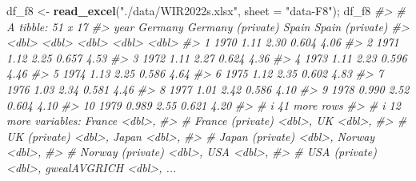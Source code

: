 \documentclass[
  xelatex, ja=standard]{bxjsbook}
\newenvironment{Shaded}{\begin{snugshade}}{\end{snugshade}}
\newcommand{\AttributeTok}[1]{\textcolor[rgb]{0.13,0.29,0.53}{#1}}
\newcommand{\CommentTok}[1]{\textcolor[rgb]{0.56,0.35,0.01}{\textit{#1}}}
\newcommand{\FunctionTok}[1]{\textcolor[rgb]{0.13,0.29,0.53}{\textbf{#1}}}
\newcommand{\NormalTok}[1]{#1}
\newcommand{\OtherTok}[1]{\textcolor[rgb]{0.56,0.35,0.01}{#1}}
\newcommand{\StringTok}[1]{\textcolor[rgb]{0.31,0.60,0.02}{#1}}
\theoremstyle{definition}
\theoremstyle{definition}
\theoremstyle{definition}
\theoremstyle{definition}
\theoremstyle{remark}
\begin{document}
\begin{Shaded}
\begin{Highlighting}[]
\NormalTok{df\_f8 }\OtherTok{\textless{}{-}} \FunctionTok{read\_excel}\NormalTok{(}\StringTok{"./data/WIR2022s.xlsx"}\NormalTok{, }\AttributeTok{sheet =} \StringTok{"data{-}F8"}\NormalTok{); df\_f8}
\CommentTok{\#\textgreater{} \# A tibble: 51 x 17}
\CommentTok{\#\textgreater{}     year Germany \textasciigrave{}Germany (private)\textasciigrave{} Spain \textasciigrave{}Spain (private)\textasciigrave{}}
\CommentTok{\#\textgreater{}    \textless{}dbl\textgreater{}   \textless{}dbl\textgreater{}               \textless{}dbl\textgreater{} \textless{}dbl\textgreater{}             \textless{}dbl\textgreater{}}
\CommentTok{\#\textgreater{}  1  1970   1.11                 2.30 0.604              4.06}
\CommentTok{\#\textgreater{}  2  1971   1.12                 2.25 0.657              4.53}
\CommentTok{\#\textgreater{}  3  1972   1.11                 2.27 0.624              4.36}
\CommentTok{\#\textgreater{}  4  1973   1.11                 2.23 0.596              4.46}
\CommentTok{\#\textgreater{}  5  1974   1.13                 2.25 0.586              4.64}
\CommentTok{\#\textgreater{}  6  1975   1.12                 2.35 0.602              4.83}
\CommentTok{\#\textgreater{}  7  1976   1.03                 2.34 0.581              4.46}
\CommentTok{\#\textgreater{}  8  1977   1.01                 2.42 0.586              4.10}
\CommentTok{\#\textgreater{}  9  1978   0.990                2.52 0.604              4.10}
\CommentTok{\#\textgreater{} 10  1979   0.989                2.55 0.621              4.20}
\CommentTok{\#\textgreater{} \# i 41 more rows}
\CommentTok{\#\textgreater{} \# i 12 more variables: France \textless{}dbl\textgreater{},}
\CommentTok{\#\textgreater{} \#   \textasciigrave{}France (private)\textasciigrave{} \textless{}dbl\textgreater{}, UK \textless{}dbl\textgreater{},}
\CommentTok{\#\textgreater{} \#   \textasciigrave{}UK (private)\textasciigrave{} \textless{}dbl\textgreater{}, Japan \textless{}dbl\textgreater{},}
\CommentTok{\#\textgreater{} \#   \textasciigrave{}Japan (private)\textasciigrave{} \textless{}dbl\textgreater{}, Norway \textless{}dbl\textgreater{},}
\CommentTok{\#\textgreater{} \#   \textasciigrave{}Norway (private)\textasciigrave{} \textless{}dbl\textgreater{}, USA \textless{}dbl\textgreater{},}
\CommentTok{\#\textgreater{} \#   \textasciigrave{}USA (private)\textasciigrave{} \textless{}dbl\textgreater{}, gwealAVGRICH \textless{}dbl\textgreater{}, ...}
\end{Highlighting}
\end{Shaded}
\end{document}

